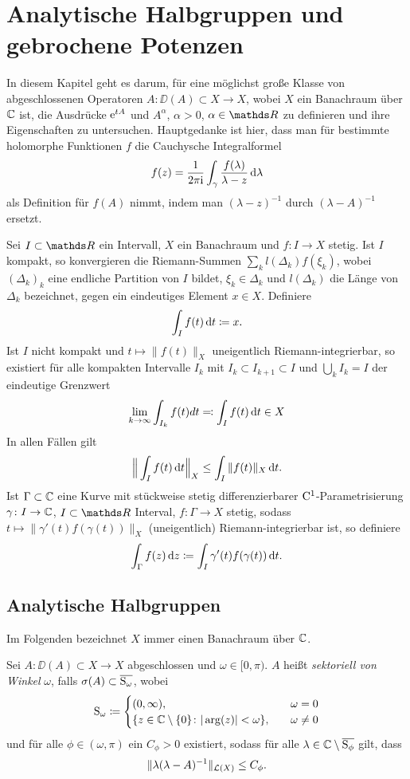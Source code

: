 \chapter{Analytische Halbgruppen und gebrochene Potenzen}

In diesem Kapitel geht es darum, für eine möglichst große Klasse von abgeschlossenen Operatoren $A \colon \DD(A) \subset X \to X$, wobei $X$ ein Banachraum über $\mathbb{C}$ ist, die Ausdrücke $\mathrm{e}^{tA}$ und $A^\alpha$, $\alpha > 0$, $\alpha \in \R$ zu definieren und ihre Eigenschaften zu untersuchen.
Hauptgedanke ist hier, dass man für bestimmte holomorphe Funktionen $f$ die Cauchysche Integralformel
$$
f(z) = \frac{1}{2\pi \mathrm{i}} \int_\gamma \frac{f(\lambda)}{\lambda - z} \, {\operatorname{d}\!{\lambda}}
$$
als Definition für $f(A)$ nimmt, indem man $(\lambda - z)^{-1}$ durch $(\lambda - A)^{-1}$ ersetzt.

Sei $I \subset \R$ ein Intervall, $X$ ein Banachraum und $f \colon I \to X$ stetig.
Ist $I$ kompakt, so konvergieren die Riemann-Summen $\sum_k l(\Delta_k) f(\xi_k)$, wobei $(\Delta_k)_k$ eine endliche Partition von $I$ bildet, $\xi_k \in \Delta_k$ und $l(\Delta_k)$ die Länge von $\Delta_k$ bezeichnet, gegen ein eindeutiges Element $x \in X$.
Definiere
$$
\int_I f(t) \, {\operatorname{d}\!{t}} \coloneqq x.
$$
Ist $I$ nicht kompakt und $t \mapsto \|f(t)\|_X$ uneigentlich Riemann-integrierbar, so existiert für alle kompakten Intervalle $I_k$ mit $I_k \subset I_{k + 1} \subset I$ und $\bigcup_k I_k = I$ der eindeutige Grenzwert
$$
\lim_{k \to \infty} \int_{I_k} f(t) dt \eqqcolon \int_I f(t) \, {\operatorname{d}\!{t}} \in X
$$
In allen Fällen gilt
$$
\Big\| \int_I f(t) \, {\operatorname{d}\!{t}} \Big\|_X \leq \int_I \|f(t) \|_X \, {\operatorname{d}\!{t}}.
$$
Ist $\Gamma \subset \mathbb{C}$ eine Kurve mit stückweise stetig differenzierbarer $\mathrm{C}^1$-Parametrisierung $\gamma \colon I \to \mathbb{C}$, $I \subset \R$ Interval, $f \colon \Gamma \to X$ stetig, sodass $t \mapsto \|\gamma'(t) f(\gamma(t)) \|_X$ (uneigentlich) Riemann-integrierbar ist, so definiere
$$
\int_\Gamma f(z) \, {\operatorname{d}\!{z}} \coloneqq \int_I \gamma'(t) f(\gamma(t)) \, {\operatorname{d}\!{t}}.
$$

\section{Analytische Halbgruppen}

Im Folgenden bezeichnet $X$ immer einen Banachraum über $\mathbb{C}$.

\begin{defn}
  Sei $A \colon \DD(A) \subset X \to X$ abgeschlossen und $\omega \in [0,\pi)$.
    $A$ heißt \emph{sektoriell von Winkel} $\omega$, falls $\sigma(A) \subset \overline{\mathrm{S}_\omega}$, wobei
    $$
    \mathrm{S}_\omega \coloneqq \begin{cases} (0,\infty), \quad&\omega = 0 \\ \{z \in \mathbb{C} \setminus\{0\} \colon |\arg(z)| < \omega\}, \quad&\omega \neq 0 \end{cases}
    $$
    und für alle $\phi \in (\omega, \pi)$ ein $C_\phi > 0$ existiert, sodass für alle $\lambda \in \mathbb{C} \setminus \overline{\mathrm{S}_\phi}$ gilt, dass
    $$
    \|\lambda(\lambda - A)^{-1}\|_{\mathcal{L}(X)} \leq C_\phi.
    $$
\end{defn}

